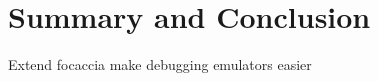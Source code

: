 
\chapter{Summary and Conclusion}\label{chapter:summary_and_conclusion}



Extend focaccia
make debugging emulators easier